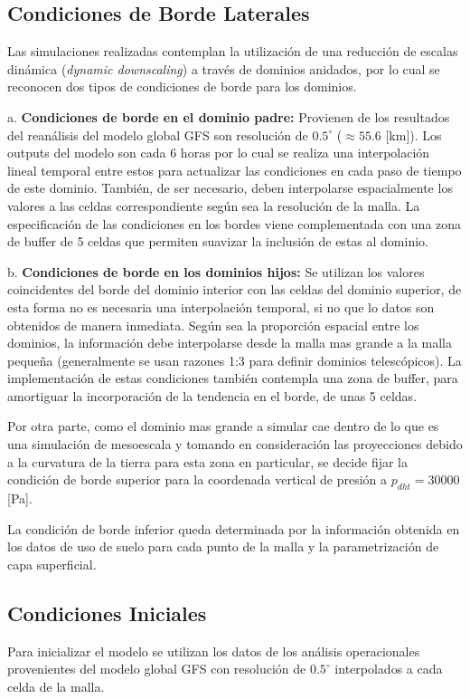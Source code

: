 \subsection{Condiciones de Borde Laterales}
Las simulaciones realizadas contemplan la utilización de una reducción de escalas dinámica (\emph{dynamic downscaling}) a través de dominios anidados, por lo cual se reconocen dos tipos de condiciones de borde para los dominios.
\begin{enumerate*}
	\item[a.] \textbf{Condiciones de borde en el dominio padre:} Provienen de los resultados del reanálisis del modelo global GFS son resolución de $0.5^\circ$ ($\approx 55.6$ [km]). Los outputs del modelo son cada 6 horas por lo cual se realiza una interpolación lineal temporal entre estos para actualizar las condiciones en cada paso de tiempo de este dominio. También, de ser necesario, deben interpolarse espacialmente los valores a las celdas correspondiente según sea la resolución de la malla. La especificación de las condiciones en los bordes viene complementada con una zona de buffer de 5 celdas que permiten suavizar la inclusión de estas al dominio.
	\item[b.] \textbf{Condiciones de borde en los dominios hijos:} Se utilizan los valores coincidentes del borde del dominio interior con las celdas del dominio superior, de esta forma no es necesaria una interpolación temporal, si no que lo datos son obtenidos de manera inmediata. Según sea la proporción espacial entre los dominios, la información debe interpolarse desde la malla mas grande a la malla pequeña (generalmente se usan razones 1:3 para definir dominios telescópicos). La implementación de estas condiciones también contempla una zona de buffer, para amortiguar la incorporación de la tendencia en el borde, de unas 5 celdas.
\end{enumerate*}
Por otra parte, como el dominio mas grande a simular cae dentro de lo que es una simulación de mesoescala y tomando en consideración las proyecciones debido a la curvatura de la tierra para esta zona en particular, se decide fijar la condición de borde superior para la coordenada vertical de presión a $p_{dht} = 30000$ [Pa].

La condición de borde inferior queda determinada por la información obtenida en los datos de uso de suelo para cada punto de la malla y la parametrización de capa superficial.
\subsection{Condiciones Iniciales}
Para inicializar el modelo se utilizan los datos de los análisis operacionales provenientes del modelo global GFS con resolución de $0.5^\circ$ interpolados a cada celda de la malla.

